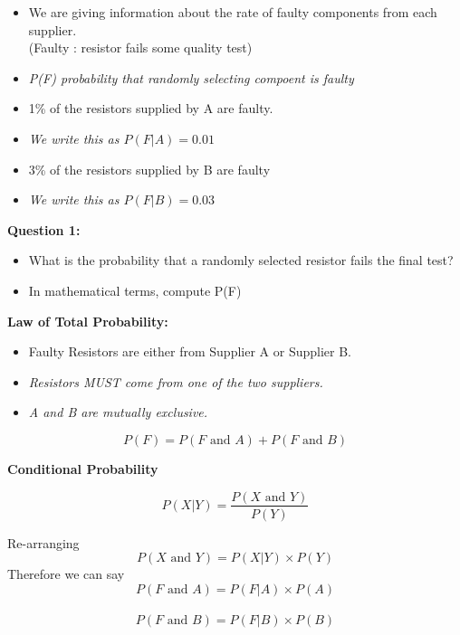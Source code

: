 \documentclass{beamer}
\begin{document}
\begin{frame} %
\Large
\begin{itemize}
\item We are giving information about the rate of faulty components from each supplier. \\(Faulty : resistor fails some quality test)
\item  \textit{P(F) probability that randomly selecting compoent is faulty}
\item 1\% of the resistors supplied by A are faulty.
\item\textit{ We write this as $P(F|A) =0.01$}
\item 3\% of the resistors supplied by B are faulty 
\item \textit{We write this as $P(F|B) =0.03$}
\end{itemize}
\end{frame}
\begin{frame} %
\Large
\vspace{-1.5cm}
\textbf{Question 1:}
\begin{itemize}
\item What is the probability that a randomly selected resistor fails the final test?

\item In mathematical terms, compute P(F) 
\end{itemize}


\end{frame}

\begin{frame}
\Large
\textbf{Law of Total Probability:}
\begin{itemize}
\item Faulty Resistors are either from Supplier A or Supplier B.
\vspace{0.3cm} 
\item \textit{Resistors MUST come from one of the two suppliers.}
\item \textit{A and B are mutually exclusive.}
\end{itemize}
\vspace{0.3cm} 
\[ P(F) = P(F \mbox{ and } A) + P(F \mbox{ and } B) \]

\end{frame}

\begin{frame}
\Large
\textbf{Conditional Probability}

\[ P(X|Y)  = \frac{P(X \mbox{ and } Y)}{P(Y)} \]

Re-arranging
\[ P(X \mbox{ and } Y) =  P(X|Y)\times P(Y) \]
Therefore we can say
\[ P(F \mbox{ and } A) =  P(F|A)\times P(A) \]\\
\[ P(F \mbox{ and } B) =  P(F|B)\times P(B) \]
\end{frame}
\end{document}
